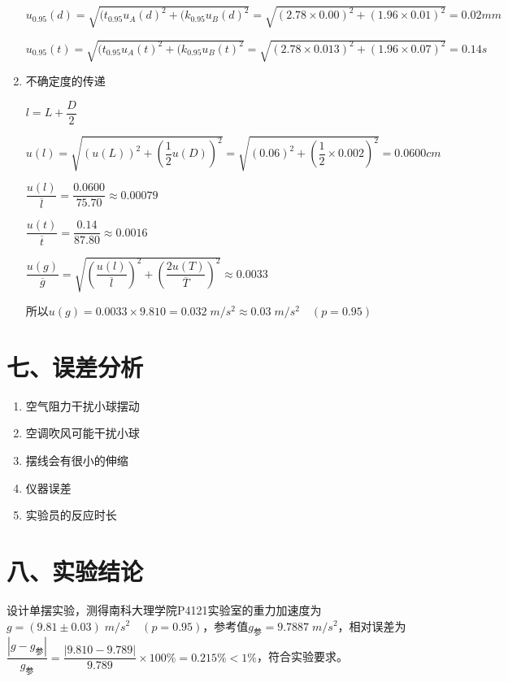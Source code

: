 \documentclass[11pt]{article}
\begin{document}
\begin{enumerate}
    $
    u_{0.95}(d)=\sqrt{(t_{0.95}u_A(d)^2+(k_{0.95}u_B(d)^2}=\sqrt{(2.78\times0.00)^2+(1.96\times0.01)^2}=0.02mm
    $
    
    $
    u_{0.95}(t)=\sqrt{(t_{0.95}u_A(t)^2+(k_{0.95}u_B(t)^2}=\sqrt{(2.78\times0.013)^2+(1.96\times0.07)^2}=0.14s
    $
    \item 不确定度的传递
    
    $l=L+\dfrac{D}{2}$
    
    $u(l)=\sqrt{(u(L))^2+\left(\dfrac{1}{2}u(D)\right)^2}=\sqrt{(0.06)^2+\left(\dfrac{1}{2}\times0.002\right)^2}=0.0600cm$
    
    $\dfrac{u(l)}{\overline{l}}=\dfrac{0.0600}{75.70}\approx0.00079$
    
    $\dfrac{u(t)}{\overline{t}}=\dfrac{0.14}{87.80}\approx0.0016$
    
    $\dfrac{u(g)}{\overline{g}}=\sqrt{\left(\dfrac{u(l)}{\overline{l}}\right)^2+\left(\dfrac{2u(T)}{\overline{T}}\right)^2}\approx0.0033$
    
    所以$u(g)=0.0033\times9.810=0.032\;m/s^2\approx0.03\;m/s^2\quad(p=0.95)$
\end{enumerate}

\section*{七、误差分析}

\begin{enumerate}
    \item 空气阻力干扰小球摆动
    \item 空调吹风可能干扰小球
    \item 摆线会有很小的伸缩
    \item 仪器误差
    \item 实验员的反应时长
\end{enumerate}

\section*{八、实验结论}

设计单摆实验，测得南科大理学院P4121实验室的重力加速度为$g=(9.81\pm0.03)\;m/s^2\quad(p=0.95)$，参考值$g_{\text{参}}=9.7887\;m/s^2$，相对误差为$\dfrac{|g-g_{\text{参}}|}{g_{\text{参}}}=\dfrac{|9.810-9.789|}{9.789}\times100\%=0.215\%<1\%$，符合实验要求。
\end{document}
